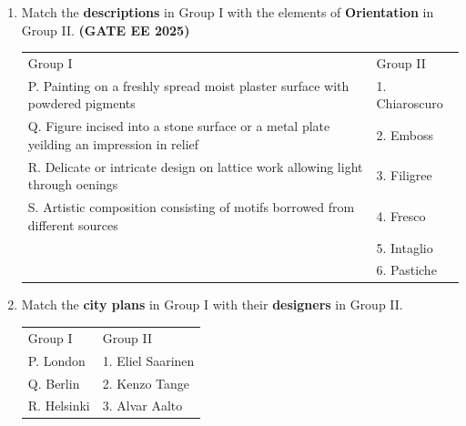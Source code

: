 \documentclass[journal,12pt,onecolumn]{IEEEtran}
\theoremstyle{remark}
\begin{document}
\begin{enumerate}
\begin{enumerate}
\end{enumerate}
\item Match the \textbf{descriptions} in Group I with the elements of \textbf{Orientation} in Group II. \hfill \textbf{(GATE EE 2025)}
\newline
\begin{tabular}{p{}p{}}
Group I     & Group II \\
P. Painting on a freshly spread moist plaster surface with powdered pigments     & 1. Chiaroscuro\\
Q. Figure incised into a stone surface or a metal plate yeilding an impression in relief & 2. Emboss\\
R. Delicate or intricate design on lattice work allowing light through oenings & 3. Filigree\\
S. Artistic composition consisting of motifs borrowed from different sources & 4. Fresco\\
  & 5. Intaglio\\
  &6. Pastiche\\
\end{tabular}
\begin{enumerate}
\end{enumerate}
\item  Match the \textbf{city plans} in Group I with their \textbf{designers} in Group II.
\newline
\begin{tabular}{p{}p{}}
Group I     & Group II \\
P. London     & 1. Eliel Saarinen\\
Q. Berlin & 2. Kenzo Tange\\
R. Helsinki & 3. Alvar Aalto\\

\end{tabular}
\end{enumerate}
\end{document}
